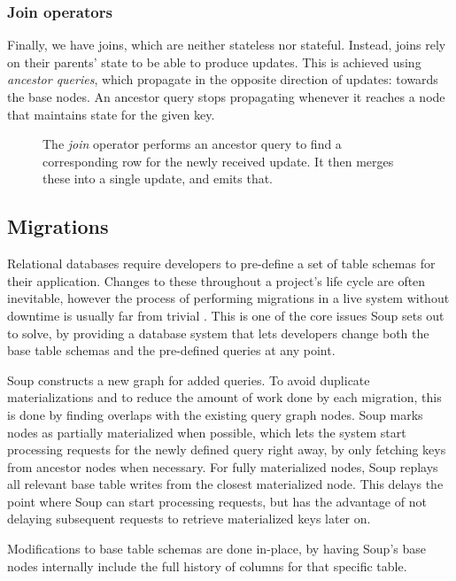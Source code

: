 \documentclass[b5paper]{report}
\begin{document}
\subsubsection{Join operators}
Finally, we have joins, which are neither stateless nor stateful. Instead, joins
rely on their parents' state to be able to produce updates. This is achieved
using \textit{ancestor queries}, which propagate in the opposite direction of
updates: towards the base nodes. An ancestor query stops propagating whenever it
reaches a node that maintains state for the given key.

\begin{figure}[H]
  \centering
  
  \caption{
    The \textit{join} operator performs an ancestor query to find a
    corresponding row for the newly received update. It then merges these into a
    single update, and emits that.
  }
\end{figure}

\subsection{Migrations}
Relational databases require developers to pre-define a set of table schemas for
their application. Changes to these throughout a project's life cycle are often
inevitable, however the process of performing migrations in a live
system without downtime is usually far from trivial \cite{stripe}. This is one
of the core issues Soup sets out to solve, by providing a database system that
lets developers change both the base table schemas and the pre-defined queries
at any point.

Soup constructs a new graph for added queries. To avoid duplicate
materializations and to reduce the amount of work done by each migration, this
is done by finding overlaps with the existing query graph nodes. Soup marks
nodes as partially materialized when possible, which lets the system start
processing requests for the newly defined query right away, by only fetching
keys from ancestor nodes when necessary. For fully materialized nodes, Soup
replays all relevant base table writes from the closest materialized node.
This delays the point where Soup can start processing requests, but has the
advantage of not delaying subsequent requests to retrieve materialized keys
later on.

Modifications to base table schemas are done in-place, by having Soup's base
nodes internally include the full history of columns for that specific table.
\end{document}
